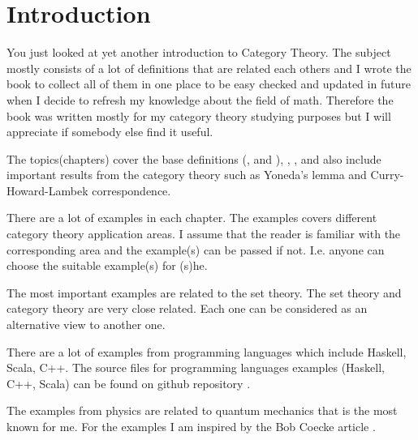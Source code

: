 \chapter*{Introduction}

You just looked at yet another introduction to Category Theory. The
subject mostly consists of a lot of definitions that are related each
others and I wrote the book to collect all of them in one
place to be easy checked and updated in future when I decide to refresh
my knowledge about the field of math. Therefore the book was written mostly
for my category theory studying 
purposes but I will appreciate if somebody else find it useful.

The topics(chapters) cover the base definitions
(,  and
), ,
,  and also include important
results from the category theory such as Yoneda's lemma and
Curry-Howard-Lambek correspondence. 

There are a lot of 
examples in each chapter. The examples covers different category
theory application areas. I assume that the reader is familiar with
the corresponding area and the example(s) can be passed if not. I.e.
anyone can choose the suitable example(s) for (s)he. 

The most important examples are related to the set theory. The set
theory and category theory are very close related. Each one can be
considered as an alternative view to another one.

There are a lot of examples from programming languages which include
Haskell, Scala, C++. The source files for programming languages 
examples (Haskell, C++, Scala) can be found on github repository
\cite{bib:github:ivanmurashko}.  

The examples from physics are related to quantum mechanics that is the
most known for me. For the examples I am inspired by the Bob Coecke
article \cite{bib:arxiv:Bob_Coecke_2008}.




